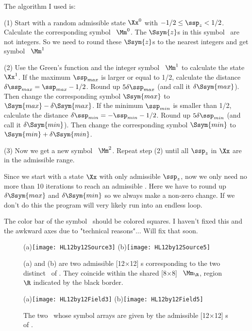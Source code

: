 \begin{description}
{The algorithm I used is:

(1) Start with a random admissible state $\Xx^{0}$ with $-1/2 \leq \ssp_z
< 1/2$. Calculate the corresponding symbol \brick\ $\Mm^{0}$. The
$\Ssym{z}$s in this symbol \brick\ are not integers. So we need to round
these $\Ssym{z}$s to the nearest integers and get symbol \brick\
$\Mm^{1}$

(2) Use the Green's function and the integer symbol \brick\ $\Mm^{1}$ to
calculate the state $\Xx^{1}$. If the maximum $\ssp_{max}$ is larger or
equal to 1/2, calculate the distance $\delta \ssp_{max} = \ssp_{max} -
1/2$. Round up $5 \delta \ssp_{max}$ (and call it $\delta \Ssym{max}$).
Then change the corresponding symbol $\Ssym{max}$ to $\Ssym{max} - \delta
\Ssym{max}$. If the minimum $\ssp_{min}$ is smaller than 1/2, calculate
the distance $\delta \ssp_{min} = - \ssp_{min} - 1/2$. Round up $5 \delta
\ssp_{min}$ (and call it $\delta \Ssym{min}$). Then change the
corresponding symbol $\Ssym{min}$ to $\Ssym{min} + \delta \Ssym{min}$.

(3) Now we get a new symbol \brick\ $\Mm^{2}$. Repeat step (2) until all
$\ssp_z$ in $\Xx$ are in the admissible range.

Since we start with a state $\Xx$ with only admissible $\ssp_z$, now we
only need no more than 10 iterations to reach an admissible \brick. Here
we have to round up $\delta \Ssym{max}$ and $\delta \Ssym{min}$ so we
always make a non-zero change. If we don't do this the program will very
likely run into an endless loop.

The color bar of the symbol \brick\ should be colored squares. I haven't
fixed this and the awkward axes due to "technical reasons"... Will fix
that soon.
}

\begin{figure}
  \centering
(a)\texttt{[image: HL12by12Source3]}
(b)\texttt{[image: HL12by12Source5]}
  \caption{\label{fig:HL12by12Source2}
(a) and (b) are two admissible [12$\times$12] \brick s corresponding to the two
distinct \twots\ of \reffig{fig:HL12by12Field2}. They coincide within the shared
[8$\times$8] \brick\  $\Mm_\R$, region $\R$ indicated by the black border.
}
\end{figure}

\begin{figure}
  \centering
(a)\texttt{[image: HL12by12Field3]}
(b)\texttt{[image: HL12by12Field5]}
  \caption{\label{fig:HL12by12Field2}
The two \twots\ whose symbol arrays are given by the admissible
[12$\times$12] \brick s of .
}
\end{figure}


\end{description}

